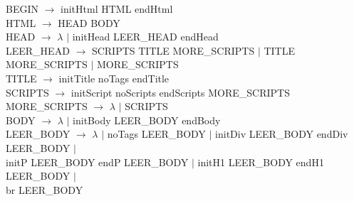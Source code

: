 \noindent BEGIN $\longrightarrow$ initHtml HTML endHtml \\
HTML $\longrightarrow$ HEAD BODY \\
HEAD $\longrightarrow$ $\lambda$ $|$ initHead LEER\_HEAD endHead \\
LEER\_HEAD $\longrightarrow$ SCRIPTS TITLE MORE\_SCRIPTS $|$ TITLE MORE\_SCRIPTS $|$ MORE\_SCRIPTS \\
TITLE $\longrightarrow$ initTitle noTags endTitle \\
SCRIPTS $\longrightarrow$ initScript noScripts endScripts MORE\_SCRIPTS \\
MORE\_SCRIPTS $\longrightarrow$ $\lambda$ $|$ SCRIPTS \\
BODY $\longrightarrow$ $\lambda$ $|$ initBody LEER\_BODY endBody \\
LEER\_BODY $\longrightarrow$ $\lambda$ $|$ noTags LEER\_BODY $|$ initDiv LEER\_BODY endDiv LEER\_BODY $|$ \\
\indent initP LEER\_BODY endP LEER\_BODY $|$ initH1 LEER\_BODY endH1 LEER\_BODY $|$ \\ 
\indent br LEER\_BODY